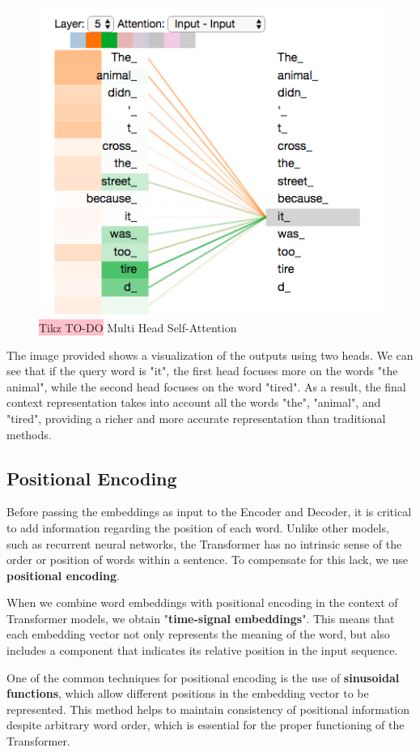 \begin{figure}[!htbp]
    \centering
    \includegraphics[width=0.5\linewidth]{tikz/chapter8 - Multi Head Self-Attention.png}
    \caption{{\color{red}\colorbox{pink}{Tikz TO-DO}} Multi Head Self-Attention}
\end{figure}

The image provided shows a visualization of the outputs using two heads. We can see that if the query word is "it", the first head focuses more on the words "the animal", while the second head focuses on the word "tired". As a result, the final context representation takes into account all the words "the", "animal", and "tired", providing a richer and more accurate representation than traditional methods.


\subsection{Positional Encoding}

Before passing the embeddings as input to the Encoder and Decoder, it is critical to add information regarding the position of each word. Unlike other models, such as recurrent neural networks, the Transformer has no intrinsic sense of the order or position of words within a sentence. To compensate for this lack, we use \textbf{positional encoding}.

When we combine word embeddings with positional encoding in the context of Transformer models, we obtain "\textbf{time-signal embeddings}". This means that each embedding vector not only represents the meaning of the word, but also includes a component that indicates its relative position in the input sequence. 

One of the common techniques for positional encoding is the use of \textbf{sinusoidal functions}, which allow different positions in the embedding vector to be represented. This method helps to maintain consistency of positional information despite arbitrary word order, which is essential for the proper functioning of the Transformer.


